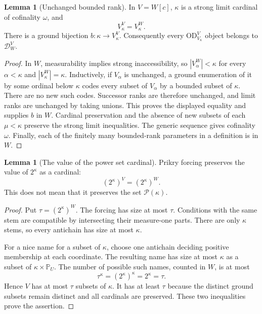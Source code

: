 \documentclass[11pt,letterpaper]{article}
\theoremstyle{definition}
\newtheorem{lemma}[definition]{Lemma}
\numberwithin{equation}{section}
\newcommand{\OD}{\mathrm{OD}}
\newcommand{\Pow}{\mathcal P}
\newcommand{\PP}{\mathbb P}
\newcommand{\Dg}{\mathcal D_W^V}
\begin{document}
\begin{lemma}[Unchanged bounded rank]\label{lem:rank}
In $V=W[c]$, $\kappa$ is a strong limit cardinal of cofinality $\omega$, and
\[
V_\kappa^V=V_\kappa^W.
\]
There is a ground bijection $b:\kappa\to V_\kappa^V$. Consequently every $\OD_{V_\kappa}^V$ object belongs to $\Dg$.
\end{lemma}
\begin{proof}
In $W$, measurability implies strong inaccessibility, so $|V_\alpha^W|<\kappa$ for every $\alpha<\kappa$ and $|V_\kappa^W|=\kappa$. Inductively, if $V_\alpha$ is unchanged, a ground enumeration of it by some ordinal below $\kappa$ codes every subset of $V_\alpha$ by a bounded subset of $\kappa$. There are no new such codes. Successor ranks are therefore unchanged, and limit ranks are unchanged by taking unions. This proves the displayed equality and supplies $b$ in $W$. Cardinal preservation and the absence of new subsets of each $\mu<\kappa$ preserve the strong limit inequalities. The generic sequence gives cofinality $\omega$. Finally, each of the finitely many bounded-rank parameters in a definition is in $W$.
\end{proof}

\begin{lemma}[The value of the power set cardinal]\label{lem:power}
Prikry forcing preserves the value of $2^\kappa$ as a cardinal:
\[
(2^\kappa)^V=(2^\kappa)^W.
\]
This does not mean that it preserves the set $\Pow(\kappa)$.
\end{lemma}
\begin{proof}
Put $\tau=(2^\kappa)^W$. The forcing has size at most $\tau$. Conditions with the same stem are compatible by intersecting their measure-one parts. There are only $\kappa$ stems, so every antichain has size at most $\kappa$.

For a nice name for a subset of $\kappa$, choose one antichain deciding positive membership at each coordinate. The resulting name has size at most $\kappa$ as a subset of $\kappa\times\PP_U$. The number of possible such names, counted in $W$, is at most
\[
\tau^\kappa=(2^\kappa)^\kappa=2^\kappa=\tau.
\]
Hence $V$ has at most $\tau$ subsets of $\kappa$. It has at least $\tau$ because the distinct ground subsets remain distinct and all cardinals are preserved. These two inequalities prove the assertion.
\end{proof}
\end{document}
